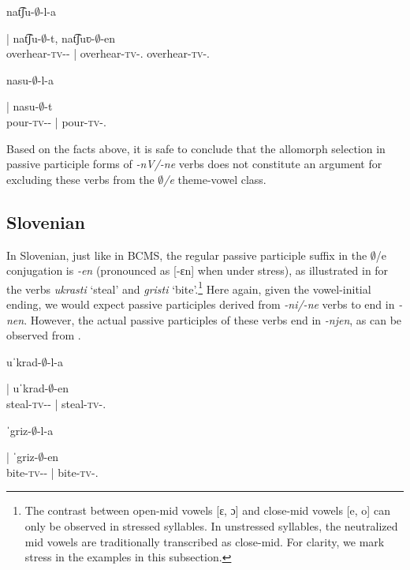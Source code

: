 \documentclass[output=paper,colorlinks,citecolor=brown]{langscibook}
\begin{document}
\ex \gll \parbox{3cm}{nat͡ʃu-$∅$-l-a} | nat͡ʃu-$∅$-t, nat͡ʃuʋ-$∅$-en\\ 
overhear-\textsc{tv}-{\PST-\FEM} | overhear-\textsc{tv}-{\PASS.\PTCP} overhear-\textsc{tv}-{\PASS.\PTCP}\\
\glt \label{str:ex:pass2-b}

\ex \gll \parbox{3cm}{nasu-$∅$-l-a} | nasu-$∅$-t\\ 
pour-\textsc{tv}-{\PST-\FEM} | pour-\textsc{tv}-{\PASS.\PTCP}\\
\glt \label{str:ex:pass2-c}

\z
\z


\noindent Based on the facts above, it is safe to conclude that the allomorph selection in passive participle forms of \textit{-nV/-ne} verbs does not constitute an argument for excluding these verbs from the \textit{$∅$/e} theme-vowel class. 

\subsection{Slovenian}

In Slovenian, just like in BCMS, the regular passive participle suffix in the $∅$/e conjugation is \textit{-en} (pronounced as {[-ɛn]} when under stress), as illustrated in  for the verbs \textit{ukrasti} `steal' and \textit{gristi} `bite'.\footnote{The contrast between open-mid vowels {[ɛ, ɔ]} and close-mid vowels {[e, o]} can only be observed in stressed syllables. In unstressed syllables, the neutralized mid vowels are traditionally transcribed as close-mid. For clarity, we mark stress in the examples in this subsection.} Here again, given the vowel-initial ending, we would expect passive participles derived from \textit{-ni/-ne} verbs to end in \textit{-nen}. However, the actual passive participles of these verbs end in \textit{-njen}, as can be observed from . 

 \ea\label{str:ex:pass3}
	\ea \gll \parbox{3cm}{uˈkrad-$∅$-l-a} | uˈkrad-$∅$-en\\ 
steal-\textsc{tv}-{\PST-\FEM} | steal-\textsc{tv}-{\PASS.\PTCP}\\
\glt \label{str:ex:pass3-a}

\ex \gll \parbox{3cm}{ˈgriz-$∅$-l-a} | ˈgriz-$∅$-en\\ 
bite-\textsc{tv}-{\PST-\FEM} | bite-\textsc{tv}-{\PASS.\PTCP}\\
\glt \label{str:ex:pass3-b}

\z
\end{document}
